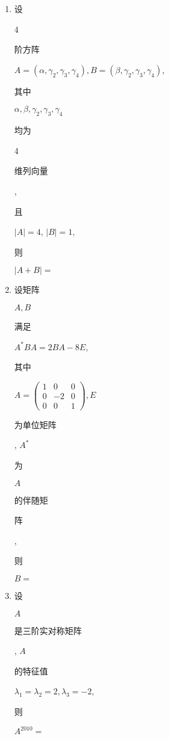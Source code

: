 \documentclass[10pt]{article}
\begin{document}
\begin{enumerate}
  \item \begin{CJK}{UTF8}{mj}设\end{CJK} 4 \begin{CJK}{UTF8}{mj}阶方阵\end{CJK} $A=\left(\alpha, \gamma_{2}, \gamma_{3}, \gamma_{4}\right), B=\left(\beta, \gamma_{2}, \gamma_{3}, \gamma_{4}\right)$, \begin{CJK}{UTF8}{mj}其中\end{CJK} $\alpha, \beta, \gamma_{2}, \gamma_{3}, \gamma_{4}$ \begin{CJK}{UTF8}{mj}均为\end{CJK} 4 \begin{CJK}{UTF8}{mj}维列向量\end{CJK}, \begin{CJK}{UTF8}{mj}且\end{CJK} $|A|=4$, $|B|=1$, \begin{CJK}{UTF8}{mj}则\end{CJK} $|A+B|=$

  \item \begin{CJK}{UTF8}{mj}设矩阵\end{CJK} $A, B$ \begin{CJK}{UTF8}{mj}满足\end{CJK} $A^{*} B A=2 B A-8 E$, \begin{CJK}{UTF8}{mj}其中\end{CJK} $A=\left(\begin{array}{ccc}1 & 0 & 0 \\ 0 & -2 & 0 \\ 0 & 0 & 1\end{array}\right), E$ \begin{CJK}{UTF8}{mj}为单位矩阵\end{CJK}, $A^{*}$ \begin{CJK}{UTF8}{mj}为\end{CJK} $A$ \begin{CJK}{UTF8}{mj}的伴随矩\end{CJK} \begin{CJK}{UTF8}{mj}阵\end{CJK}, \begin{CJK}{UTF8}{mj}则\end{CJK} $B=$

  \item \begin{CJK}{UTF8}{mj}设\end{CJK} $A$ \begin{CJK}{UTF8}{mj}是三阶实对称矩阵\end{CJK}, $A$ \begin{CJK}{UTF8}{mj}的特征值\end{CJK} $\lambda_{1}=\lambda_{2}=2, \lambda_{3}=-2$, \begin{CJK}{UTF8}{mj}则\end{CJK} $A^{2010}=$


\end{enumerate}
\end{document}
